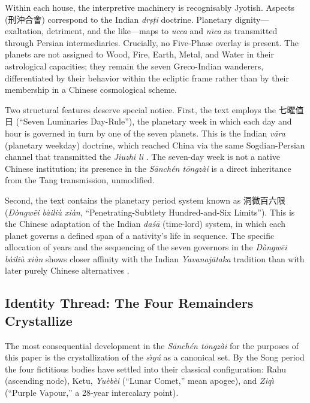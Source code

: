 \documentclass[10pt,a4paper]{article}
\newcommand{\zh}[1]{#1}
\begin{document}
Within each house, the interpretive machinery is recognisably Jyotish.
Aspects (\zh{刑沖合會}) correspond to the Indian \textit{dr\d{s}\d{t}i}
doctrine.  Planetary dignity---exaltation, detriment, and the like---maps
to \textit{ucca} and \textit{n\={\i}ca} as transmitted through Persian
intermediaries.  Crucially, no Five-Phase overlay is present.
The planets are not assigned to Wood, Fire, Earth, Metal, and Water in
their astrological capacities; they remain the seven Greco-Indian wanderers,
differentiated by their behavior within the ecliptic frame rather than by
their membership in a Chinese cosmological scheme.

Two structural features deserve special notice.  First, the text employs
the \zh{七曜值日} (``Seven Luminaries Day-Rule''), the planetary week in
which each day and hour is governed in turn by one of the seven planets.
This is the Indian \textit{v\={a}ra} (planetary weekday) doctrine, which
reached China via the same Sogdian-Persian channel that transmitted the
\textit{Jiuzhi li} \citep{mak2024persian}.  The seven-day week is not
a native Chinese institution; its presence in the \textit{S\={a}nch\'{e}n t\={o}ngz\`{a}i} is a
direct inheritance from the Tang transmission, unmodified.

Second, the text contains the planetary period system known as
\zh{洞微百六限} (\textit{D\`ongw\=ei b\`aili\`u xi\`an},
``Penetrating-Subtlety Hundred-and-Six Limits'').  This is the Chinese
adaptation of the Indian \textit{da\'{s}\={a}} (time-lord) system, in which
each planet governs a defined span of a nativity's life in sequence.
The specific allocation of years and the sequencing of the seven governors
in the \textit{D\`ongw\=ei b\`aili\`u xi\`an} shows closer affinity with the Indian
\textit{Yavanaj\={a}taka} tradition than with later purely Chinese
alternatives \citep{ho2003astrology}.

\subsection*{Identity Thread: The Four Remainders Crystallize}

The most consequential development in the \textit{S\={a}nch\'{e}n t\={o}ngz\`{a}i} for the purposes
of this paper is the crystallization of the \textit{s\`{\i}y\'u} as a canonical set.
By the Song period the four fictitious bodies have settled into their
classical configuration: Rahu (ascending node), Ketu,
\textit{Yu\`eb\`ei} (``Lunar Comet,'' mean apogee),
and \textit{Ziq\`{\i}} (``Purple Vapour,'' a 28-year
intercalary point).
\end{document}

